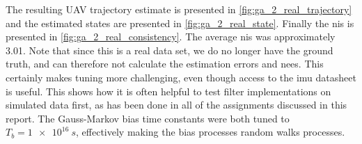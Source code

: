 The resulting UAV trajectory estimate is presented in \cref{fig:ga_2_real_trajectory} and the estimated states are presented in \cref{fig:ga_2_real_state}. Finally the \acrshort{nis} is presented in \cref{fig:ga_2_real_consistency}. The average \acrshort{nis} was approximately 3.01. Note that since this is a real data set, we do no longer have the ground truth, and can therefore not calculate the estimation errors and \acrshort{nees}. This certainly makes tuning more challenging, even though access to the \acrshort{imu} datasheet is useful. This shows how it is often helpful to test filter implementations on simulated data first, as has been done in all of the assignments discussed in this report. The Gauss-Markov bias time constants were both tuned to $T_b = \SI{1e16}{s}$, effectively making the bias processes random walks processes.

